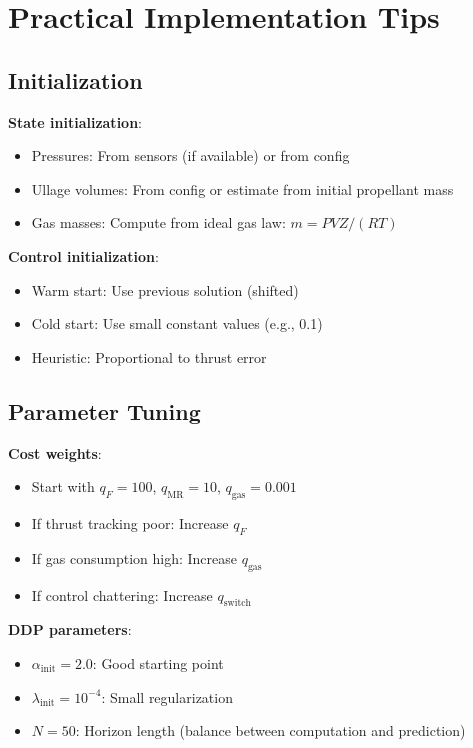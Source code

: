 \documentclass[11pt,a4paper]{article}
\begin{document}
\section{Practical Implementation Tips}

\subsection{Initialization}

\textbf{State initialization}:
\begin{itemize}
    \item Pressures: From sensors (if available) or from config
    \item Ullage volumes: From config or estimate from initial propellant mass
    \item Gas masses: Compute from ideal gas law: $m = PVZ/(RT)$
\end{itemize}

\textbf{Control initialization}:
\begin{itemize}
    \item Warm start: Use previous solution (shifted)
    \item Cold start: Use small constant values (e.g., 0.1)
    \item Heuristic: Proportional to thrust error
\end{itemize}

\subsection{Parameter Tuning}

\textbf{Cost weights}:
\begin{itemize}
    \item Start with $q_F = 100$, $q_{\text{MR}} = 10$, $q_{\text{gas}} = 0.001$
    \item If thrust tracking poor: Increase $q_F$
    \item If gas consumption high: Increase $q_{\text{gas}}$
    \item If control chattering: Increase $q_{\text{switch}}$
\end{itemize}

\textbf{DDP parameters}:
\begin{itemize}
    \item $\alpha_{\text{init}} = 2.0$: Good starting point
    \item $\lambda_{\text{init}} = 10^{-4}$: Small regularization
    \item $N = 50$: Horizon length (balance between computation and prediction)
\end{itemize}
\end{document}
